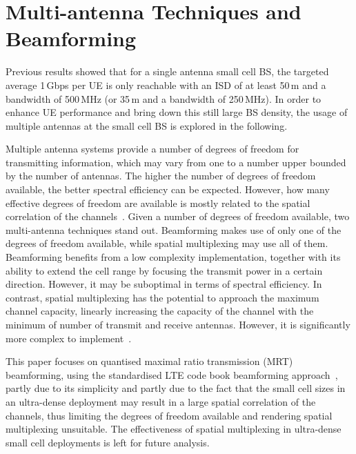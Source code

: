 \documentclass{IEEEtran}
\begin{document}
\section{Multi-antenna Techniques and Beamforming}
\label{Sec:MIMO}

Previous results showed that for a single antenna small cell \ac{BS},
the targeted average 1\,Gbps per \ac{UE} is only reachable with an \ac{ISD} of at least 50\,m and a bandwidth of 500\,MHz (or 35\,m and a bandwidth of 250\,MHz).
In order to enhance \ac{UE} performance and bring down this still large \ac{BS} density,
the usage of multiple antennas at the small cell \ac{BS} is explored in the following.

Multiple antenna systems provide a number of degrees of freedom for transmitting information,
which may vary from one to a number upper bounded by the number of antennas.
The higher the number of degrees of freedom available,
the better spectral efficiency can be expected.
However, how many effective degrees of freedom are available is mostly related to the spatial correlation of the channels~\cite{4274995}.
Given a number of degrees of freedom available,
two multi-antenna techniques stand out.
Beamforming makes use of only one of the degrees of freedom available,
while spatial multiplexing may use all of them.
Beamforming benefits from a low complexity implementation,
together with its ability to extend the cell range by focusing the transmit power in a certain direction.
However, it may be suboptimal in terms of spectral efficiency.
In contrast, spatial multiplexing has the potential to approach the maximum channel capacity,
linearly increasing the capacity of the channel with the minimum of number of transmit and receive antennas.
However, it is significantly more complex to implement~\cite{4274995}.


This paper focuses on quantised maximal ratio transmission (MRT) beamforming,
using the standardised \ac{LTE} code book beamforming approach~\cite{LTEbook},
partly due to its simplicity and partly due to the fact that the small cell sizes in an ultra-dense deployment may result in a large spatial correlation of the channels,
thus limiting the degrees of freedom available and rendering spatial multiplexing unsuitable.
The effectiveness of spatial multiplexing in ultra-dense small cell deployments is left for future analysis.
\end{document}
